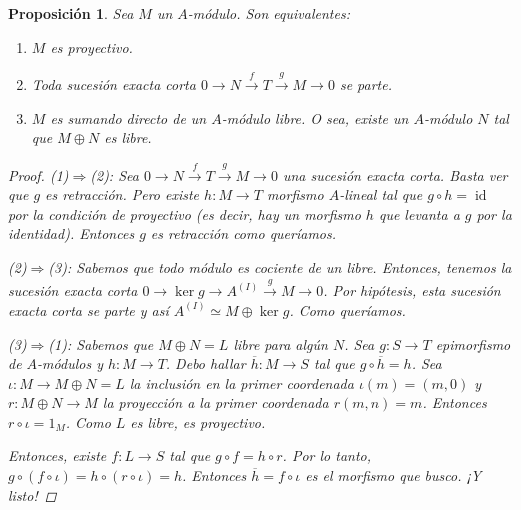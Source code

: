 \documentclass[12pt]{book}
\newtheorem{prop}[teo]{Proposición}
\theoremstyle{definition}
\DeclareMathOperator{\id}{id}
\begin{document}
\begin{prop}
Sea $M$ un $A$-módulo. Son equivalentes:\begin{enumerate}\item $M$ es proyectivo. \item Toda sucesión exacta corta $0\longrightarrow N\stackrel{f}{\longrightarrow} T\stackrel{g}{\longrightarrow} M\longrightarrow 0$ se parte. \item $M$ es sumando directo de un $A$-módulo libre. O sea, existe un $A$-módulo $N$ tal que $M\oplus N$ es libre.\end{enumerate}
\begin{proof}
(1)$\Longrightarrow$(2): Sea $0\longrightarrow N\stackrel{f}{\longrightarrow} T\stackrel{g}{\longrightarrow} M\longrightarrow 0$ una sucesión exacta corta. Basta ver que $g$ es retracción. Pero existe $h:M\to T$ morfismo $A$-lineal tal que $g\circ h=\id$ por la condición de proyectivo (es decir, hay un morfismo $h$ que levanta a $g$ por la identidad). Entonces $g$ es retracción como queríamos.

(2)$\Longrightarrow$(3): Sabemos que todo módulo es cociente de un libre. Entonces, tenemos la sucesión exacta corta $0\longrightarrow \ker g\longrightarrow A^{(I)}\stackrel{g}{\longrightarrow} M \longrightarrow 0$. Por hipótesis, esta sucesión exacta corta se parte y así $A^{(I)}\simeq M\oplus \ker g$. Como queríamos.

(3)$\Longrightarrow$(1): Sabemos que $M\oplus N=L$ libre para algún $N$. Sea $g:S\to T$ epimorfismo de $A$-módulos y $h:M\to T$. Debo hallar $\overline{h}:M\to S$ tal que $g\circ \overline{h}=h$. Sea $\iota:M\to M\oplus N=L$ la inclusión en la primer coordenada $\iota(m)=(m,0)$ y $r:M\oplus N\to M$ la proyección a la primer coordenada $r(m,n)=m$. Entonces $r\circ \iota = 1_M$. Como $L$ es libre, es proyectivo. 


Entonces, existe $f:L\to S$ tal que $g\circ f = h\circ r$. Por lo tanto, $g\circ (f\circ \iota) = h\circ (r\circ\iota) = h$. Entonces $\overline{h}=f\circ\iota$ es el morfismo que busco. ¡Y listo!



\end{proof}
\end{prop}
\end{document}
